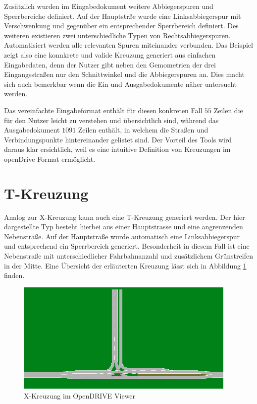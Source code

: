 Zusätzlich wurden im Eingabedokument weitere Abbiegerspuren und Sperrbereiche definiert. Auf der Hauptstrße wurde eine Linksabbiegerspur mit Verschwenkung und gegenüber ein entsprechender Sperrbereich definiert. Des weiteren existieren zwei unterschiedliche Typen von Rechtsabbiegerspuren. Automatisiert werden alle relevanten Spuren miteinander verbunden. Das Beispiel zeigt also eine konnkrete und valide Kreuzung generiert aus einfachen Eingabedaten, denn der Nutzer gibt neben den Gemometrien der drei Eingangsstraßen nur den Schnittwinkel und die Abbiegerspuren an. Dies macht sich auch bemerkbar wenn die Ein und Ausgabedokumente näher untersucht werden. 

Das vereinfachte Eingabeformat enthält für diesen konkreten Fall \(55\) Zeilen die für den Nutzer leicht zu verstehen und übersichtlich sind, während das Ausgabedokument \(1091\) Zeilen enthält, in welchem die Straßen und Verbindungspunkte hintereinander gelistet sind. Der Vorteil des Tools wird daraus klar ersichtlich, weil es eine intuitive Definition von Kreuzungen im openDrive Format ermöglicht. 

\section{T-Kreuzung}
Analog zur X-Kreuzung kann auch eine T-Kreuzung generiert werden. Der hier dargestellte Typ besteht hierbei aus einer Hauptstrasse und eine angrenzenden Nebenstraße. Auf der Hauptstraße wurde automatisch eine Linksabbiegerspur und entsprechend ein Sperrbereich generiert. Besonderheit in diesem Fall ist eine Nebenstraße mit unterschiedlicher Fahrbahnanzahl und zusätzlichem Grünstreifen in der Mitte. Eine Übersicht der erläuterten Kreuzung lässt sich in Abbildung \ref{abb7} finden.

\begin{figure}[H]
    \flushleft
    \includegraphics[width=0.95\textwidth]{fig/junction3.png}
    \caption{X-Kreuzung im OpenDRIVE Viewer}
    \label{abb7}
\end{figure}


